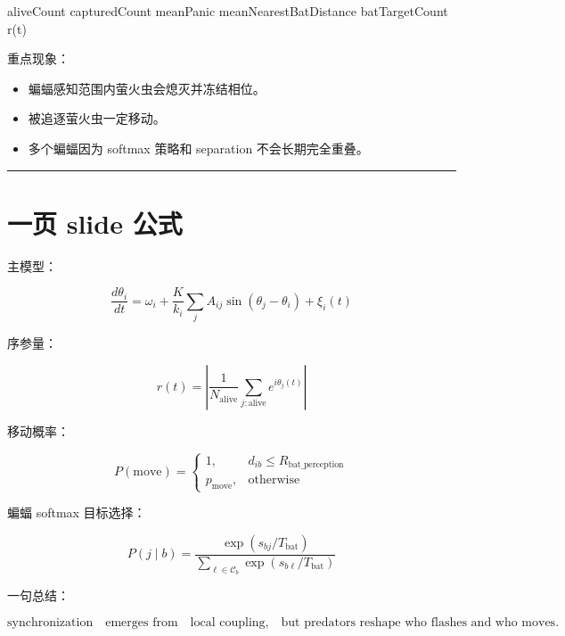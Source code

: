 \documentclass[UTF8]{ctexart}
\begin{document}
\begin{codeblock}
aliveCount
capturedCount
meanPanic
meanNearestBatDistance
batTargetCount
r(t)
\end{codeblock}

重点现象：

\begin{itemize}
\item 蝙蝠感知范围内萤火虫会熄灭并冻结相位。
\item 被追逐萤火虫一定移动。
\item 多个蝙蝠因为 softmax 策略和 separation 不会长期完全重叠。
\end{itemize}

\bigskip
\hrule
\bigskip

\section{一页 slide 公式}

主模型：

\[
\frac{d\theta_i}{dt}
=
\omega_i
+
\frac{K}{k_i}
\sum_j A_{ij}\sin(\theta_j-\theta_i)
+
\xi_i(t)
\]

序参量：

\[
r(t)=
\left|
\frac{1}{N_{\text{alive}}}
\sum_{j:\text{alive}}
e^{i\theta_j(t)}
\right|
\]

移动概率：

\[
P(\text{move})=
\begin{cases}
1,&d_{ib}\le R_{\text{bat\_perception}}\\
p_{\text{move}},&\text{otherwise}
\end{cases}
\]

蝙蝠 softmax 目标选择：

\[
P(j\mid b)
=
\frac{
\exp(s_{bj}/T_{\text{bat}})
}{
\sum_{\ell\in \mathcal{C}_b}
\exp(s_{b\ell}/T_{\text{bat}})
}
\]

一句总结：

\[
\text{synchronization}
\quad\text{emerges from}\quad
\text{local coupling},
\quad
\text{but predators reshape who flashes and who moves.}
\]
\end{document}
